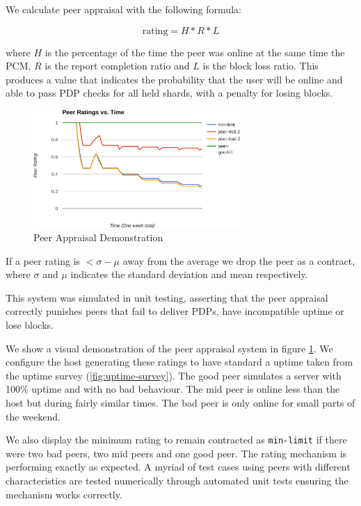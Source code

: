 \documentclass[11pt, a4paper, twoside]{report}
\def\code#1{\texttt{#1}}
\begin{document}
We calculate peer appraisal with the following formula:

$$\mbox{rating} = H * R * L$$

where $H$ is the percentage of the time the peer was online at the same time the PCM, $R$ is the report completion ratio and $L$ is the block loss ratio. This produces a value that indicates the probability that the user will be online and able to pass PDP checks for all held shards, with a penalty for losing blocks.

\begin{figure}[h]
 \centering
 \includegraphics[width=0.7\textwidth]{peer-appraisal}
 \caption{Peer Appraisal Demonstration}
 \label{fig:peer-appraisal}
\end{figure}

If a peer rating is $<\sigma - \mu$ away from the average we drop the peer as a contract, where $\sigma$ and $\mu$ indicates the standard deviation and mean respectively.

This system was simulated in unit testing, asserting that the peer appraisal correctly punishes peers that fail to deliver PDPs, have incompatible uptime or lose blocks.

We show a visual demonstration of the peer appraisal system in figure \ref{fig:peer-appraisal}. We configure the host generating these ratings to have standard a uptime taken from the uptime survey (\ref{fig:uptime-survey}). The good peer simulates a server with 100\% uptime and with no bad behaviour. The mid peer is online less than the host but during fairly similar times. The bad peer is only online for small parts of the weekend.

We also display the minimum rating to remain contracted as \code{min-limit} if there were two bad peers, two mid peers and one good peer. The rating mechanism is performing exactly as expected. A myriad of test cases using peers with different characteristics  are tested numerically through automated unit tests ensuring the mechanism works correctly.
\end{document}
